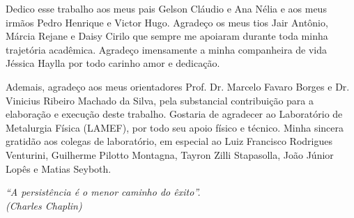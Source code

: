 \documentclass[
	12pt,				%
	openright,			%
	oneside,			%
	a4paper,			%
	english,			%
	french,				%
	spanish,			%
	brazil				%
	]{abntex2}
\begin{document}
\begin{agradecimentos}

Dedico esse trabalho aos meus pais Gelson Cláudio e Ana Nélia e aos meus irmãos Pedro Henrique e Victor Hugo. Agradeço os meus tios Jair Antônio, Márcia Rejane e Daisy Cirilo que sempre me apoiaram durante toda minha trajetória acadêmica. Agradeço imensamente a minha companheira de vida Jéssica Haylla por todo carinho amor e dedicação.

Ademais, agradeço aos meus orientadores Prof. Dr. Marcelo Favaro Borges e Dr. Vinicius Ribeiro Machado da Silva, pela substancial contribuição para a elaboração e execução deste trabalho. Gostaria de agradecer ao Laboratório de Metalurgia Física (LAMEF), por todo seu apoio físico e técnico. Minha sincera gratidão aos colegas de laboratório, em especial ao Luiz Francisco Rodrigues Venturini, Guilherme Pilotto Montagna, Tayron Zilli Stapasolla, João Júnior Lopês e Matias Seyboth. 



\end{agradecimentos}


\begin{epigrafe}
	\vspace*{\fill}
	\begin{flushright}
		\textit{“A persistência é o menor caminho do êxito”. \\(Charles Chaplin)}
	\end{flushright}
\end{epigrafe}


\end{document}

